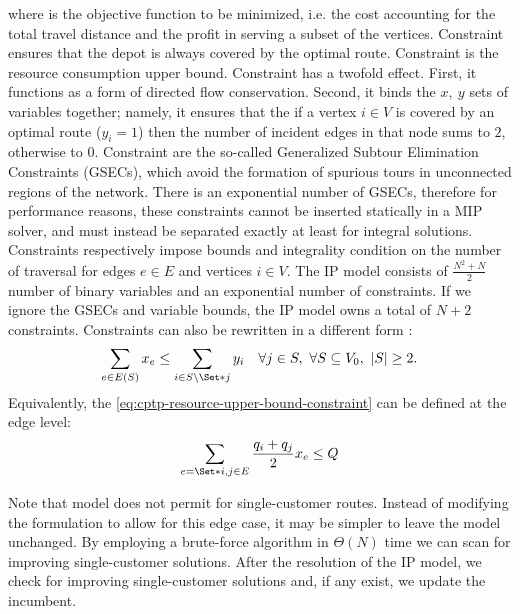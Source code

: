 where  is the objective function to be minimized, i.e. the cost
accounting for the total travel distance and the profit in serving a subset of the vertices.
Constraint  ensures that the depot is always covered by the optimal route.
Constraint  is the resource consumption upper bound.
Constraint  has a twofold effect.
First, it functions as a form of directed flow conservation.
Second, it binds the $x,\ y$ sets of variables together;
namely, it ensures that the if a vertex $i \in V$ is covered by an optimal route ($y_i = 1$)
then the number of incident edges in that node sums to $2$, otherwise to $0$.
Constraint 
are the so-called Generalized Subtour Elimination Constraints (GSECs),
which avoid the formation of spurious tours in unconnected regions of the network.
There is an exponential number of GSECs,
therefore for performance reasons,
these constraints cannot be inserted statically in a MIP solver,
and must instead be separated exactly at least for integral solutions.
Constraints  respectively
impose bounds and integrality condition
on the number of traversal for edges $e \in E$ and vertices $i \in V$.
The IP model consists of $\frac{N^2 + N}{2}$ number of binary variables and an exponential number of constraints.
If we ignore the GSECs and variable bounds, the IP model owns a total of $N + 2$ constraints.
Constraints 
can also be rewritten in a different form \parencite{wolsey2020integer}:
\begin{equation}
	\label{eq:cptp-gsec-constraints-v2}
	\sum\limits_{e \in E(S)} x_e \le \sum\limits_{i \in S \setminus \Set*{j}} y_i \quad \forall j \in S,\ \forall S \subseteq V_0,\ |S| \ge 2.
\end{equation}
Equivalently,
the \cref{eq:cptp-resource-upper-bound-constraint}
can be defined at the edge level:
\begin{equation}
	\sum_{e = \Set*{i, j} \in E} \frac{q_i + q_j}{2} x_e \le Q
\end{equation}

Note that model
does not permit for single-customer routes.
Instead of modifying the formulation to allow for this edge case,
it may be simpler to leave the model unchanged.
By employing a brute-force algorithm in $\Theta(N)$ time we can scan for improving single-customer solutions.
After the resolution of the IP model,
we check for improving single-customer solutions and,
if any exist,
we update the incumbent.


